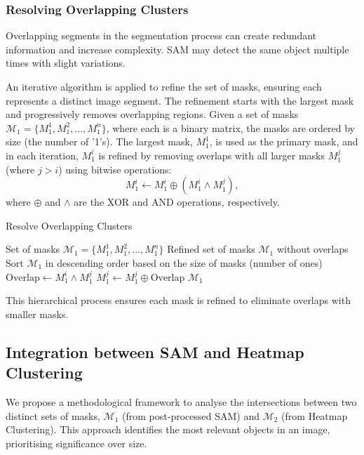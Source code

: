 \subsubsection{Resolving Overlapping Clusters}

Overlapping segments in the segmentation process can create redundant information and increase complexity. SAM may detect the same object multiple times with slight variations. 

An iterative algorithm is applied to refine the set of masks, ensuring each represents a distinct image segment. The refinement starts with the largest mask and progressively removes overlapping regions. Given a set of masks \(\mathcal{M}_1 = \{M_1^1, M_1^2, \ldots, M_1^n\}\), where each is a binary matrix, the masks are ordered by size (the number of '1's). The largest mask, \(M_1^1\), is used as the primary mask, and in each iteration, \(M_1^i\) is refined by removing overlaps with all larger masks \(M_1^j\) (where \(j > i\)) using bitwise operations:
\begin{equation}
M_1^i \leftarrow M_1^i \oplus (M_1^i \land M_1^j),
\end{equation}
where \( \oplus \) and \( \land \) are the XOR and AND operations, respectively.


\begin{algorithm}
\caption{Resolve Overlapping Clusters}
\begin{algorithmic}[1]
\Require Set of masks $\mathcal{M}_1 = \{M_1^1, M_1^2, \ldots, M_1^n\}$
\Ensure Refined set of masks $\mathcal{M}_1$ without overlaps
\State Sort $\mathcal{M}_1$ in descending order based on the size of masks (number of ones)
        \State $\text{Overlap} \gets M_1^i \land M_1^j$ 
            \State $M_1^j \gets M_1^j \oplus \text{Overlap}$ 
        \EndIf
    \EndFor
\EndFor
\State \Return $\mathcal{M}_1$
\end{algorithmic}
\end{algorithm}


This hierarchical process ensures each mask is refined to eliminate overlaps with smaller masks.

\subsection{Integration between SAM and Heatmap Clustering}
\label{sec:integration}
We propose a methodological framework to analyse the intersections between two distinct sets of masks, \(\mathcal{M}_1\) (from post-processed SAM) and \(\mathcal{M}_2\) (from Heatmap Clustering). This approach identifies the most relevant objects in an image, prioritising significance over size.
 
